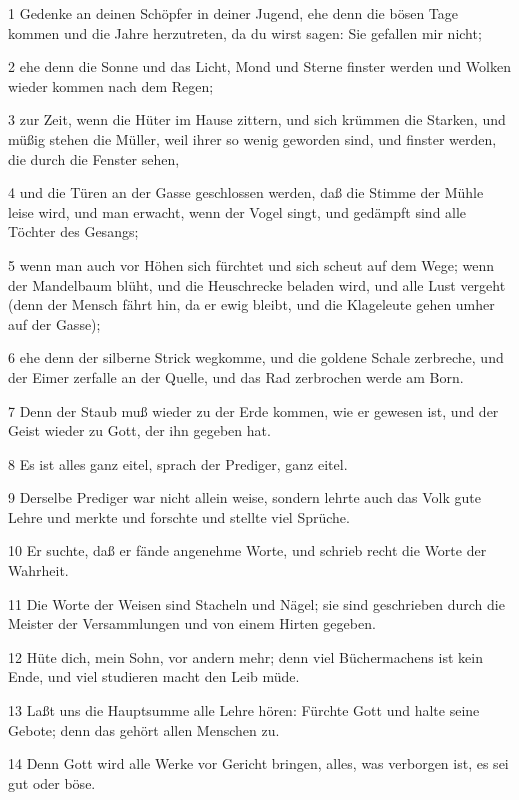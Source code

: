 \par 1 Gedenke an deinen Schöpfer in deiner Jugend, ehe denn die bösen Tage kommen und die Jahre herzutreten, da du wirst sagen: Sie gefallen mir nicht;
\par 2 ehe denn die Sonne und das Licht, Mond und Sterne finster werden und Wolken wieder kommen nach dem Regen;
\par 3 zur Zeit, wenn die Hüter im Hause zittern, und sich krümmen die Starken, und müßig stehen die Müller, weil ihrer so wenig geworden sind, und finster werden, die durch die Fenster sehen,
\par 4 und die Türen an der Gasse geschlossen werden, daß die Stimme der Mühle leise wird, und man erwacht, wenn der Vogel singt, und gedämpft sind alle Töchter des Gesangs;
\par 5 wenn man auch vor Höhen sich fürchtet und sich scheut auf dem Wege; wenn der Mandelbaum blüht, und die Heuschrecke beladen wird, und alle Lust vergeht (denn der Mensch fährt hin, da er ewig bleibt, und die Klageleute gehen umher auf der Gasse);
\par 6 ehe denn der silberne Strick wegkomme, und die goldene Schale zerbreche, und der Eimer zerfalle an der Quelle, und das Rad zerbrochen werde am Born.
\par 7 Denn der Staub muß wieder zu der Erde kommen, wie er gewesen ist, und der Geist wieder zu Gott, der ihn gegeben hat.
\par 8 Es ist alles ganz eitel, sprach der Prediger, ganz eitel.
\par 9 Derselbe Prediger war nicht allein weise, sondern lehrte auch das Volk gute Lehre und merkte und forschte und stellte viel Sprüche.
\par 10 Er suchte, daß er fände angenehme Worte, und schrieb recht die Worte der Wahrheit.
\par 11 Die Worte der Weisen sind Stacheln und Nägel; sie sind geschrieben durch die Meister der Versammlungen und von einem Hirten gegeben.
\par 12 Hüte dich, mein Sohn, vor andern mehr; denn viel Büchermachens ist kein Ende, und viel studieren macht den Leib müde.
\par 13 Laßt uns die Hauptsumme alle Lehre hören: Fürchte Gott und halte seine Gebote; denn das gehört allen Menschen zu.
\par 14 Denn Gott wird alle Werke vor Gericht bringen, alles, was verborgen ist, es sei gut oder böse.


